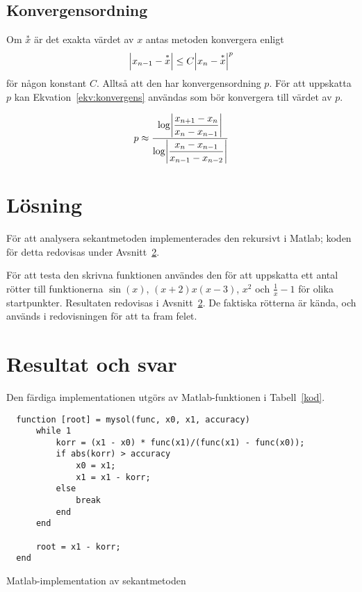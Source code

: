 \documentclass[12pt]{article}
\DeclarePairedDelimiter\abs{\lvert}{\rvert}
\begin{document}
\subsection{Konvergensordning}
Om $\overset{*}{x}$ är det exakta värdet av $x$ antas metoden konvergera enligt 
\[
  \abs*{x_{n-1}-\overset{*}{x}}\leq C\abs*{x_n-\overset{*}{x}}^p
\]
för någon konstant $C$. Alltså att den har konvergensordning $p$. För att uppskatta $p$ kan Ekvation~\ref{ekv:konvergens} användas som bör konvergera till värdet av $p$.

\begin{equation}
  p\approx\dfrac{\log\abs*{\dfrac{x_{n+1}-x_n}{x_n-x_{n-1}}}}{\log\abs*{\dfrac{x_n-x_{n-1}}{x_{n-1}-x_{n-2}}}}
\label{ekv:konvergens}
\end{equation}

\section{Lösning}
För att analysera sekantmetoden implementerades den rekursivt i Matlab; koden för detta redovisas under Avsnitt~\ref{resultat}.

För att testa den skrivna funktionen användes den för att uppskatta ett antal rötter till funktionerna $\sin(x)$, $ (x+2) x (x-3)$, $x^2$ och $\frac{1}{x} - 1$ för olika startpunkter. Resultaten redovisas i Avsnitt~\ref{resultat}. De faktiska rötterna är kända, och används i redovisningen för att ta fram felet. 

\section{Resultat och svar} \label{resultat}
Den färdiga implementationen utgörs av Matlab-funktionen i Tabell~\ref{kod}.
\begin{table}[H]
  \begin{lstlisting}
  function [root] = mysol(func, x0, x1, accuracy)
      while 1
          korr = (x1 - x0) * func(x1)/(func(x1) - func(x0));
          if abs(korr) > accuracy
              x0 = x1;
              x1 = x1 - korr;
          else
              break
          end
      end

      root = x1 - korr;
  end
  \end{lstlisting}
  \caption{Matlab-implementation av sekantmetoden}\label{kod}
\end{table}
\end{document}
